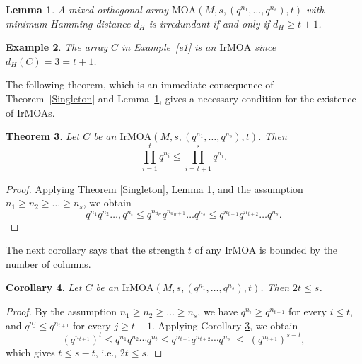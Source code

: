 \documentclass[11pt]{article}
\newtheorem{Theorem}{Theorem}[section]
\newtheorem{Corollary}[Theorem]{Corollary}
\newtheorem{Example}[Theorem]{Example}
\newtheorem{Definition and Notation}[Theorem]{Definition and Notation}
\newtheorem{Lemma}[Theorem]{Lemma}
\begin{document}
\begin{Lemma}\cite[Lemma 3]{SSCZ2022}\label{m88}
A mixed orthogonal array $\mathrm{MOA}(M,s,(q^{n_1},\dots,q^{n_s}),t)$ with minimum Hamming distance $d_H$ is irredundant if and only if $d_H\ge t+1$. 
\end{Lemma}


\begin{Example}  
The array $C$ in Example~\ref{e1} is an $\mathrm{IrMOA}$ since $d_H(C)=3=t+1$.
\end{Example}

The following theorem, which is an immediate consequence of Theorem~\ref{Singleton} and Lemma~\ref{m88}, gives a necessary condition for the existence of IrMOAs.

\begin{Theorem}\label{m66}
Let $C$ be an $\mathrm{IrMOA}(M, s, (q^{n_1},\dots, q^{n_s}), t)$. Then
$$\prod_{i=1}^{t} q^{n_i}\le \prod_{i=t+1}^{s} q^{n_i}.$$
\end{Theorem}

\begin{proof}
Applying Theorem \ref{Singleton}, Lemma \ref{m88}, and the assumption $n_1\geq n_2\geq \ldots \geq n_s$, we obtain
$$q^{n_1}q^{n_2}\ldots, q^{n_t}\leq q^{n_{d_H}}q^{n_{d_H+1}}\ldots q^{n_s}\leq q^{n_{t+1}}q^{n_{t+2}}\ldots q^{n_s}.$$
\end{proof}

The next corollary says that the strength $t$ of any IrMOA is bounded by the number of columns.
    
\begin{Corollary} \label{m87}
Let $C$ be an $\mathrm{IrMOA}(M, s, (q^{n_1},\dots, q^{n_s}), t)$. Then  $2t\leq s$.
\end{Corollary}

\begin{proof}
By the assumption $n_1\geq n_2\geq \ldots \geq n_s$,  we have $q^{n_i}\ge q^{n_{t+1}}$ for every $i\le t$,  and $q^{n_j}\le q^{n_{t+1}}$ for every $j\ge t+1$.  Applying Corollary \ref{m66}, we obtain
$$
(q^{n_{t+1}})^t\leq q^{n_1}q^{n_2}\cdots q^{n_t} \leq q^{n_{t+1}}q^{n_{t+2}}\cdots q^{n_s} \;\le\; (q^{n_{t+1}})^{s-t},
$$
which gives $t\le s-t$, i.e., $2t\leq s$. 
\end{proof}
\end{document}
